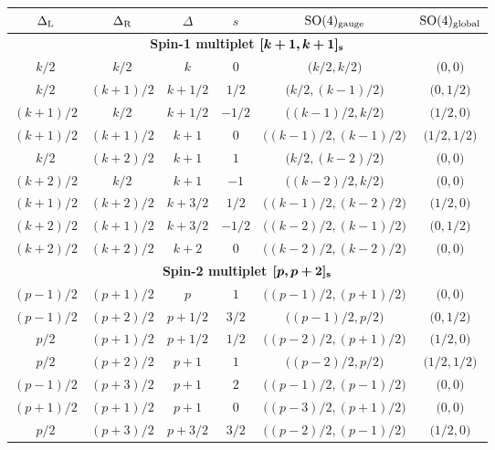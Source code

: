 \documentclass[11pt]{article}
\newcommand{\SO}{\ensuremath{\mathrm{SO}}\xspace}
\begin{document}
\begin{table}[t!]
\renewcommand{\arraystretch}{1.5}
  \centering
  \begin{tabular}{cccccc}
    $\Delta_{\rm L}$ & $\Delta_{\rm R}$ & $\Delta$ & $s$ & $\SO(4)_{\rm gauge}$ & $\SO(4)_{\rm global}$ \\ \hline\hline
    \multicolumn{6}{c}{\bfseries Spin-1 multiplet $\boldsymbol{[k+1,k+1]_{\rm s}}$} \\ \hline
    $k/2$ & $k/2$ & $k$ & $0$ & $\big(k/2,k/2\big)$ & $\big(0,0\big)$ \\
    $k/2$ & $(k+1)/2$ & $k+1/2$ & $1/2$ & $\big(k/2,(k-1)/2\big)$ & $\big(0,1/2\big)$ \\
    $(k+1)/2$ & $k/2$ & $k+1/2$ & $-1/2$ & $\big((k-1)/2,k/2\big)$ & $\big(1/2,0\big)$ \\
    $(k+1)/2$ & $(k+1)/2$ & $k+1$ & $0$ & $\big((k-1)/2,(k-1)/2\big)$ & $\big(1/2,1/2\big)$ \\
    $k/2$ & $(k+2)/2$ & $k+1$ & $1$ & $\big(k/2,(k-2)/2\big)$ & $\big(0,0\big)$ \\
    $(k+2)/2$ & $k/2$ & $k+1$ & $-1$ & $\big((k-2)/2,k/2\big)$ & $\big(0,0\big)$ \\
    $(k+1)/2$ & $(k+2)/2$ & $k+3/2$ & $1/2$ & $\big((k-1)/2,(k-2)/2\big)$ & $\big(1/2,0\big)$ \\
    $(k+2)/2$ & $(k+1)/2$ & $k+3/2$ & $-1/2$ & $\big((k-2)/2,(k-1)/2\big)$ & $\big(0,1/2\big)$ \\
    $(k+2)/2$ & $(k+2)/2$ & $k+2$ & $0$ & $\big((k-2)/2,(k-2)/2\big)$ & $\big(0,0\big)$ \\ \hline
    \multicolumn{6}{c}{\bfseries Spin-2 multiplet $\boldsymbol{[p,p+2]_{\rm s}}$} \\ \hline
    $(p-1)/2$ & $(p+1)/2$ & $p$ & $1$ & $\big((p-1)/2,(p+1)/2\big)$ & $\big(0,0\big)$ \\
    $(p-1)/2$ & $(p+2)/2$ & $p+1/2$ & $3/2$ & $\big((p-1)/2,p/2\big)$ & $\big(0,1/2\big)$ \\
    $p/2$ & $(p+1)/2$ & $p+1/2$ & $1/2$ & $\big((p-2)/2,(p+1)/2\big)$ & $\big(1/2,0\big)$ \\
    $p/2$ & $(p+2)/2$ & $p+1$ & $1$ & $\big((p-2)/2,p/2\big)$ & $\big(1/2,1/2\big)$ \\
    $(p-1)/2$ & $(p+3)/2$ & $p+1$ & $2$ & $\big((p-1)/2,(p-1)/2\big)$ & $\big(0,0\big)$ \\
    $(p+1)/2$ & $(p+1)/2$ & $p+1$ & $0$ & $\big((p-3)/2,(p+1)/2\big)$ & $\big(0,0\big)$ \\
    $p/2$ & $(p+3)/2$ & $p+3/2$ & $3/2$ & $\big((p-2)/2,(p-1)/2\big)$ & $\big(1/2,0\big)$ \\

\end{tabular}
\end{table}
\end{document}
